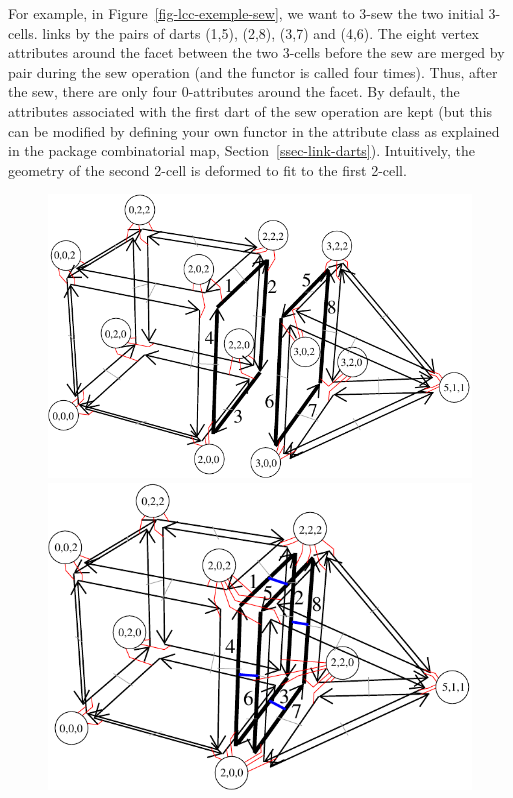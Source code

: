 For example, in Figure~\ref{fig-lcc-exemple-sew}, we want to 3-sew the
two initial 3-cells.  links by \betatrois{} the pairs
of darts (1,5), (2,8), (3,7) and (4,6). The eight vertex attributes
around the facet between the two 3-cells before the sew are merged by
pair during the sew operation (and the  functor is
called four times). Thus, after the sew, there are only four
0-attributes around the facet. By default, the attributes associated
with the first dart of the sew operation are kept (but this can be
modified by defining your own functor in the attribute class as
explained in the package combinatorial map, Section~\ref{ssec-link-darts}). 
Intuitively, the
geometry of the second 2-cell is deformed to fit to the first 2-cell.
%
\def\LargFig{.45\textwidth}
\begin{figure}
  \begin{ccTexOnly}
    \begin{center}
      \includegraphics[width=\LargFig]{Linear_cell_complex/fig/pdf/exemple-carte-with_point_3d-sew}\qquad
      \includegraphics[width=\LargFig]{Linear_cell_complex/fig/pdf/exemple-carte-with_point_3d-sew2}

\end{center}
\end{ccTexOnly}
\end{figure}
